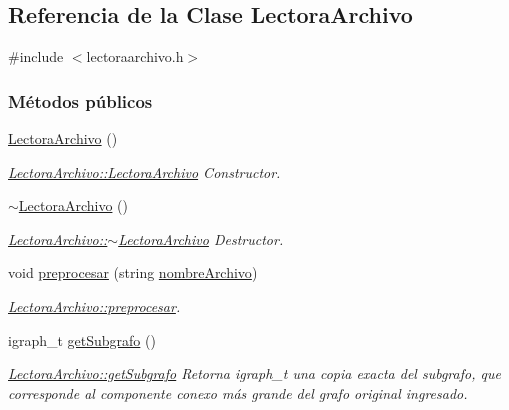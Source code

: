 \hypertarget{class_lectora_archivo}{\subsection{Referencia de la Clase Lectora\-Archivo}
\label{class_lectora_archivo}
}


{\ttfamily \#include $<$lectoraarchivo.\-h$>$}

\subsubsection*{Métodos públicos}
\begin{DoxyCompactItemize}
\item 
\hyperlink{class_lectora_archivo_aae77d0c44d180ec72244accb93d2f5ac}{Lectora\-Archivo} ()
\begin{DoxyCompactList}\small\item\em \hyperlink{class_lectora_archivo_aae77d0c44d180ec72244accb93d2f5ac}{Lectora\-Archivo\-::\-Lectora\-Archivo} Constructor. \end{DoxyCompactList}\item 
\hyperlink{class_lectora_archivo_a84fdf7dce27b3e1f3a6b36c3d24c6150}{$\sim$\-Lectora\-Archivo} ()
\begin{DoxyCompactList}\small\item\em \hyperlink{class_lectora_archivo_a84fdf7dce27b3e1f3a6b36c3d24c6150}{Lectora\-Archivo\-::$\sim$\-Lectora\-Archivo} Destructor. \end{DoxyCompactList}\item 
void \hyperlink{class_lectora_archivo_afcfe1ce17164087c3dac3939e1183391}{preprocesar} (string \hyperlink{class_lectora_archivo_ac3cddfb1afc543a82eb72efbc80b501f}{nombre\-Archivo})
\begin{DoxyCompactList}\small\item\em \hyperlink{class_lectora_archivo_afcfe1ce17164087c3dac3939e1183391}{Lectora\-Archivo\-::preprocesar}. \end{DoxyCompactList}\item 
igraph\-\_\-t \hyperlink{class_lectora_archivo_ad6314a01d7360d2304c715e8f535d667}{get\-Subgrafo} ()
\begin{DoxyCompactList}\small\item\em \hyperlink{class_lectora_archivo_ad6314a01d7360d2304c715e8f535d667}{Lectora\-Archivo\-::get\-Subgrafo} Retorna igraph\-\_\-t una copia exacta del subgrafo, que corresponde al componente conexo m\'{a}s grande del grafo original ingresado. \end{DoxyCompactList}\item 

\end{DoxyCompactItemize}
